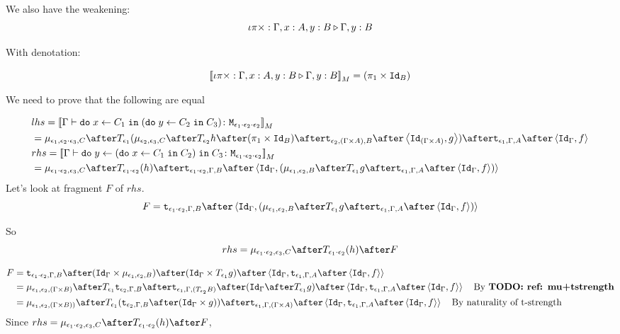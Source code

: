 {    We also have the weakening:
    \begin{equation}
        \iota\pi\times : \Gamma, x: A, y: B \triangleright \Gamma, y: B
    \end{equation}

    With denotation:

    \begin{equation}
        {\bf [\![}\iota\pi\times : \Gamma, x: A, y: B \triangleright \Gamma, y: B{\bf ]\!]}_M = (\pi_1 \times \texttt{Id}_{B})
    \end{equation}

    We need to prove that the following are equal

    \begin{align}
        &lhs =  \deno{\gtyperelation{\doin{x}{C_1}{(\doin{y}{C_2}{C_3})}}{\M{\e_1\dot\e_2\dot\e_2}}} \\
        & = \bind{\e_1}{\e_2\dot\e_3}{C}\after\T{
            \e_1}{(\bind{\e_2}{\e_3}{C}\after\T{\e_2}{h\after(\p \times \Id{B})}\after\tstrength{\e_2}{(\G\times A)}{B}\after\pr{\Id{(\G\times A)}}{g}
            )}\after\tstrength{\e_1}{\G}{A}\after\pr{\idg}{f}\\
        & rhs = \deno{\gtyperelation{\doin{y}{(\doin{x}{C_1}{C_2})}{C_3}}{\M{\e_1\dot\e_2\dot\e_2}}}  \\
        & = \bind{\e_1\dot\e_2}{\e_3}{C}\after\T{\e_1\dot\e_2}{(h)}\after\tstrength{\e_1\dot\e_2}{\G}{B}\after\pr{\idg}{(\bind{\e_1}{\e_2}{B}\after\T{\e_1}{g}\after\tstrength{\e_1}{\G}{A}\after\pr{\idg}{f})} \\
    \end{align}
    Let's look at fragment $F$ of $rhs$.
    \begin{equation}
        F = \tstrength{\e_1\dot\e_2}{\G}{B}\after\pr{\idg}{(\bind{\e_1}{\e_2}{B}\after\T{\e_1}{g}\after\tstrength{\e_1}{\G}{A}\after\pr{\idg}{f})}
    \end{equation}

    So 
    \begin{equation}
        rhs = \bind{\e_1\dot\e_2}{\e_3}{C}\after\T{\e_1\dot\e_2}{(h)}\after F
    \end{equation}

    \begin{equation}
        \begin{split}
            F & = \tstrength{\e_1\dot\e_2}{\G}{B}\after(\idg\times\bind{\e_1}{\e_2}{B})\after(\idg\times\T{\e_1}{g})\after\pr{\idg}{\tstrength{\e_1}{\G}{A}\after\pr{\idg}{f}}\\
            &  = \bind{\e_1}{\e_2}{(\G\times B)} \after \T{\e_1}{\tstrength{\e_2}{\G}{B}} \after\tstrength{\e_1}{\G}{(\T{\e_2}{B})} \after (\idg \after\T{\e_1}{g})\after\pr{\idg}{\tstrength{\e_1}{\G}{A}\after\pr{\idg}{f}}\qt{By \todo{ref: mu+tstrength}}
            \\ & = \bind{\e_1}{\e_2}{(\G \times B))} \after \T{\e_1}{(\tstrength{\e_2}{\G}{B} \after (\idg \times g))} \after \tstrength{\e_1}{\G}{(\G \times A)} \after \pr{\idg}{\tstrength{\e_1}{\G}{A}\after\pr{\idg}{f}}\qt{By naturality of t-strength}
        \end{split}
    \end{equation}
    Since
    $
        rhs = \bind{\e_1\dot\e_2}{\e_3}{C}\after\T{\e_1\dot\e_2}{(h)}\after F
    $, 

}
